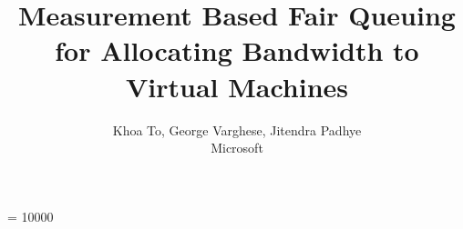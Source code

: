 \documentclass{sig-alternate-10pt}
\begin{document}
\widowpenalty = 10000

\title{Measurement Based Fair Queuing for Allocating Bandwidth to Virtual Machines}

\author{Khoa To, George Varghese, Jitendra Padhye \\ Microsoft}

\maketitle










\end{document}
